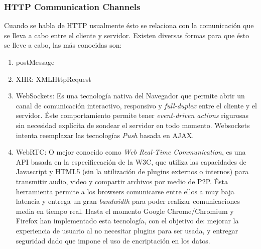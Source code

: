         \subsubsection{HTTP Communication Channels}
        \label{chap2:comunHTTP}
        Cuando se habla de HTTP usualmente ésto se relaciona con la comunicación que se lleva a cabo entre el cliente y servidor. Existen diversas formas para que ésto se lleve a cabo, las más conocidas son:
        \begin{enumerate}
            \item postMessage

            \item XHR: XMLHttpRequest

            \item WebSockets: Es una tecnología nativa del Navegador que permite abrir un canal de comunicación interactivo, responsivo y \textit{full-duplex} entre el cliente y el servidor. Éste comportamiento permite tener \textit{event-driven actions} rigurosas sin necesidad explícita de sondear el servidor en todo momento. Websockets intenta reemplazar las tecnologías \textit{Push} basada en AJAX.

            \item WebRTC: O mejor conocido como \textit{Web Real-Time Communication}, es una API basada en la especificcación de la W3C, que utiliza las capacidades de Javascript y HTML5 (sin la utilización de plugins externos o internos) para transmitir audio, video y compartir archivos por medio de P2P. Ésta herramienta permite a los browsers comunicarse entre ellos a muy baja latencia y entrega un gran \textit{bandwidth} para poder realizar comunicaciones media en tiempo real. Hasta el momento Google Chrome/Chromium y Firefox han implementado esta tecnología, con el objetivo de: mejorar la experiencia de usuario al no necesitar plugins para ser usada, y entregar seguridad dado que impone el uso de encriptación en los datos.
        \end{enumerate}

